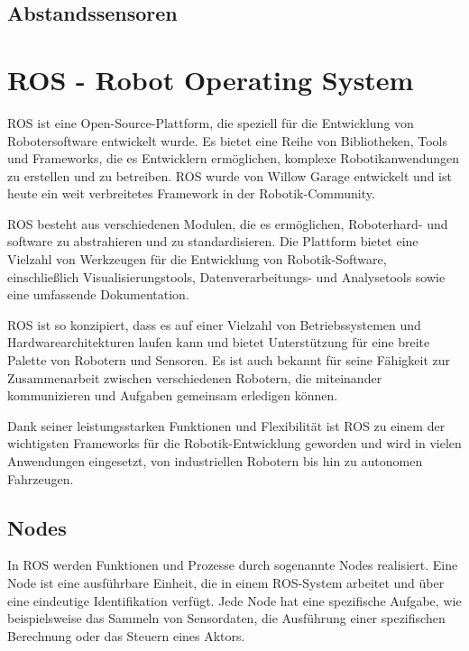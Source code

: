 


    

    \subsection{Abstandssensoren} \label{abstandssensoren:subsection}

\section{ROS - Robot Operating System} \label{ros:section}
\ac{ROS} ist eine Open-Source-Plattform, die speziell für die Entwicklung von Robotersoftware entwickelt wurde. Es bietet eine Reihe von Bibliotheken, Tools und Frameworks, die es Entwicklern ermöglichen, komplexe Robotikanwendungen zu erstellen und zu betreiben. \ac{ROS} wurde von Willow Garage entwickelt und ist heute ein weit verbreitetes Framework in der Robotik-Community.

\ac{ROS} besteht aus verschiedenen Modulen, die es ermöglichen, Roboterhard-  und software zu abstrahieren und zu standardisieren. Die Plattform bietet eine Vielzahl von Werkzeugen für die Entwicklung von Robotik-Software, einschließlich Visualisierungstools, Datenverarbeitungs- und Analysetools sowie eine umfassende Dokumentation.

\ac{ROS} ist so konzipiert, dass es auf einer Vielzahl von Betriebssystemen und Hardwarearchitekturen laufen kann und bietet Unterstützung für eine breite Palette von Robotern und Sensoren. Es ist auch bekannt für seine Fähigkeit zur Zusammenarbeit zwischen verschiedenen Robotern, die miteinander kommunizieren und Aufgaben gemeinsam erledigen können.

Dank seiner leistungsstarken Funktionen und Flexibilität ist \ac{ROS} zu einem der wichtigsten Frameworks für die Robotik-Entwicklung geworden und wird in vielen Anwendungen eingesetzt, von industriellen Robotern bis hin zu autonomen Fahrzeugen.

    \subsection{Nodes} \label{nodes:subsection}
    In \ac{ROS} werden Funktionen und Prozesse durch sogenannte Nodes realisiert. Eine Node ist eine ausführbare Einheit, die in einem \ac{ROS}-System arbeitet und über eine eindeutige Identifikation verfügt. Jede Node hat eine spezifische Aufgabe, wie beispielsweise das Sammeln von Sensordaten, die Ausführung einer spezifischen Berechnung oder das Steuern eines Aktors.

